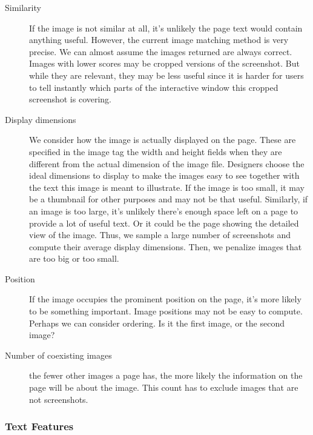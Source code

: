\documentclass{www2010-submission}
\begin{document}
\begin{description}

\item[Similarity] If the image is not similar at all, it's
unlikely the page text would contain anything useful. However, the
current image matching method is very precise. We can almost
assume the images returned are always correct. Images with lower
scores may be cropped versions of the screenshot. But while they
are relevant, they may be less useful since it is harder for users
to tell instantly which parts of the interactive window this
cropped screenshot is covering.

\item[Display dimensions]

We consider how the image is actually displayed on the page. These
are specified in the image tag the width and height fields when
they are different from the actual dimension of the image file.
Designers choose the ideal dimensions to display to make the
images easy to see together with the text this image is meant to
illustrate. If the image is too small, it may be a thumbnail for
other purposes and may not be that useful. Similarly, if an image
is too large, it's unlikely there's enough space left on a page to
provide a lot of useful text. Or it could be the page showing the
detailed view of the image. Thus, we sample a large number of
screenshots and compute their average display dimensions. Then, we
penalize images that are too big or too small.

\item[Position]

If the image occupies the prominent position on the page, it's
more likely to be something important. Image positions may not be
easy to compute. Perhaps we can consider ordering. Is it the first
image, or the second image?

\item[Number of coexisting images] the fewer other images
a page has, the more likely the information on the page will be
about the image. This count has to exclude images that are not
screenshots.

\end{description}

\subsubsection{Text Features}
\end{document}
